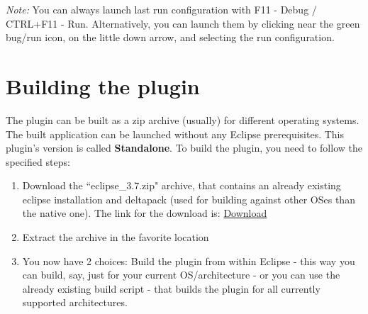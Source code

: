 \documentclass[10pt]{article}
\begin{document}
\textit{Note:} You can always launch last run configuration with F11 - Debug / CTRL+F11 - Run. Alternatively, you can launch them by clicking near the green bug/run icon, on the little down arrow, and selecting the run configuration.

\section{Building the plugin}
The plugin can be built as a zip archive (usually) for different operating systems. The built application can be launched without any Eclipse prerequisites. This plugin's version is called \textbf{Standalone}. To build the plugin, you need to follow the specified steps:

\begin{enumerate}
  \item Download the ``eclipse\_3.7.zip" archive, that contains an already existing eclipse installation and deltapack (used for building against other OSes than the native one). The link for the download is: \href{http://sourceforge.net/projects/wesnoth/files/wesnoth-umcplugin/build\_utils/eclipse\_3.7.zip/download}{Download}

  \item Extract the archive in the favorite location

  \item You now have 2 choices: Build the plugin from within Eclipse - this way you can build, say, just for your current OS/architecture - or you can use the already existing build script - that builds the plugin for all currently supported architectures.


\end{enumerate}
\end{document}

